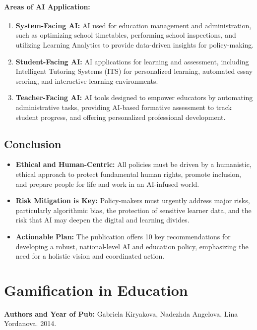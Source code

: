 \documentclass[12pt,a4paper]{report}
\begin{document}
\paragraph{Areas of AI Application:}
\begin{enumerate}
  \item \textbf{System-Facing AI:} AI used for education management and administration, such as optimizing school timetables, performing school inspections, and utilizing Learning Analytics to provide data-driven insights for policy-making.
  \item \textbf{Student-Facing AI:} AI applications for learning and assessment, including Intelligent Tutoring Systems (ITS) for personalized learning, automated essay scoring, and interactive learning environments.
  \item \textbf{Teacher-Facing AI:} AI tools designed to empower educators by automating administrative tasks, providing AI-based formative assessment to track student progress, and offering personalized professional development.
\end{enumerate}

\subsection{Conclusion}
\begin{itemize}
  \item \textbf{Ethical and Human-Centric:} All policies must be driven by a humanistic, ethical approach to protect fundamental human rights, promote inclusion, and prepare people for life and work in an AI-infused world.
  \item \textbf{Risk Mitigation is Key:} Policy-makers must urgently address major risks, particularly algorithmic bias, the protection of sensitive learner data, and the risk that AI may deepen the digital and learning divides.
  \item \textbf{Actionable Plan:} The publication offers 10 key recommendations for developing a robust, national-level AI and education policy, emphasizing the need for a holistic vision and coordinated action.
\end{itemize}

\section{Gamification in Education}
\textbf{Authors and Year of Pub:} Gabriela Kiryakova, Nadezhda Angelova, Lina Yordanova. 2014.
\end{document}
